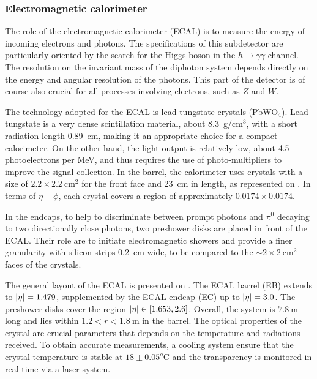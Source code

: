         \subsubsection{Electromagnetic calorimeter}

    The role of the electromagnetic calorimeter (ECAL) is to measure the energy of incoming electrons
    and photons. The specifications of this subdetector are particularly oriented by
    the search for the Higgs boson in the $h \rightarrow \gamma \gamma$ channel. The resolution on the
    invariant mass of the diphoton system depends directly on the energy and angular
    resolution of the photons. This part of the detector is of course also crucial for
    all processes involving electrons, such as $Z$ and $W$.

    The technology adopted for the ECAL is lead tungstate crystals (PbWO$_4$). Lead
    tungstate is a very dense scintillation material, about 8.3~g/cm$^3$, with a short
    radiation length 0.89~cm, making it an appropriate choice for a compact calorimeter.
    On the other hand, the light output is relatively low, about 4.5 photoelectrons
    per MeV, and thus requires the use of photo-multipliers to improve the signal collection.
    In the barrel, the calorimeter uses crystals with a size of $2.2\times2.2~\text{cm}^2$
    for the front face and 23~cm in length, as represented on .
    In terms of $\eta-\phi$, each crystal covers a region of approximately $0.0174
    \times 0.0174$.


    In the endcaps, to help to discriminate between prompt photons and $\pi^0$ decaying
    to two directionally close photons, two preshower disks are placed in front of the
    ECAL. Their role are to initiate electromagnetic showers and provide a finer granularity
    with silicon strips 0.2~cm wide, to be compared to the $\sim2\times2~\text{cm}^2$ faces
    of the crystals.


    The general layout of the ECAL is presented on . The ECAL
    barrel (EB) extends to $\left| \eta \right| = 1.479$, supplemented by the ECAL endcap (EC)
    up to $\left| \eta \right| = 3.0$. The preshower disks cover the region $\left| \eta \right| \in [1.653,2.6]$.
    Overall, the system is $7.8~\text{m}$ long and lies within $1.2 < r < 1.8~\text{m}$
    in the barrel.
    The optical properties of the crystal are crucial parameters that depends on the
    temperature and radiations received. To obtain accurate measurements, a cooling
    system ensure that the crystal temperature is stable at $18\pm0.05^o\text{C}$ and the
    transparency is monitored in real time via a laser system.

